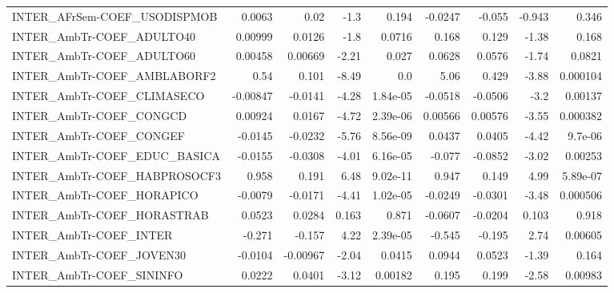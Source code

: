 \begin{tabular}{lrrrrrrrr}
INTER\_AFrSem-COEF\_USODISPMOB           &      0.0063 &         0.02 &     -1.3 &    0.194 &    -0.0247 &      -0.055 &       -0.943 &         0.346 \\
INTER\_AmbTr-COEF\_ADULTO40              &     0.00999 &       0.0126 &     -1.8 &   0.0716 &      0.168 &       0.129 &        -1.38 &         0.168 \\
INTER\_AmbTr-COEF\_ADULTO60              &     0.00458 &      0.00669 &    -2.21 &    0.027 &     0.0628 &      0.0576 &        -1.74 &        0.0821 \\
INTER\_AmbTr-COEF\_AMBLABORF2            &        0.54 &        0.101 &    -8.49 &      0.0 &       5.06 &       0.429 &        -3.88 &      0.000104 \\
INTER\_AmbTr-COEF\_CLIMASECO             &    -0.00847 &      -0.0141 &    -4.28 & 1.84e-05 &    -0.0518 &     -0.0506 &         -3.2 &       0.00137 \\
INTER\_AmbTr-COEF\_CONGCD                &     0.00924 &       0.0167 &    -4.72 & 2.39e-06 &    0.00566 &     0.00576 &        -3.55 &      0.000382 \\
INTER\_AmbTr-COEF\_CONGEF                &     -0.0145 &      -0.0232 &    -5.76 & 8.56e-09 &     0.0437 &      0.0405 &        -4.42 &       9.7e-06 \\
INTER\_AmbTr-COEF\_EDUC\_BASICA           &     -0.0155 &      -0.0308 &    -4.01 & 6.16e-05 &     -0.077 &     -0.0852 &        -3.02 &       0.00253 \\
INTER\_AmbTr-COEF\_HABPROSOCF3           &       0.958 &        0.191 &     6.48 & 9.02e-11 &      0.947 &       0.149 &         4.99 &      5.89e-07 \\
INTER\_AmbTr-COEF\_HORAPICO              &     -0.0079 &      -0.0171 &    -4.41 & 1.02e-05 &    -0.0249 &     -0.0301 &        -3.48 &      0.000506 \\
INTER\_AmbTr-COEF\_HORASTRAB             &      0.0523 &       0.0284 &    0.163 &    0.871 &    -0.0607 &     -0.0204 &        0.103 &         0.918 \\
INTER\_AmbTr-COEF\_INTER                 &      -0.271 &       -0.157 &     4.22 & 2.39e-05 &     -0.545 &      -0.195 &         2.74 &       0.00605 \\
INTER\_AmbTr-COEF\_JOVEN30               &     -0.0104 &     -0.00967 &    -2.04 &   0.0415 &     0.0944 &      0.0523 &        -1.39 &         0.164 \\
INTER\_AmbTr-COEF\_SININFO               &      0.0222 &       0.0401 &    -3.12 &  0.00182 &      0.195 &       0.199 &        -2.58 &       0.00983 \\

\end{tabular}
